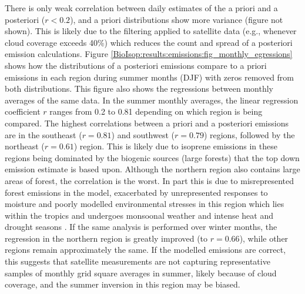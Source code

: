     
    
    
    
    
    There is only weak correlation between daily estimates of the a priori and a posteriori ($r < 0.2$), and a priori distributions show more variance (figure not shown).
    This is likely due to the filtering applied to satellite data (e.g., whenever cloud coverage exceeds 40\%) which reduces the count and spread of a posteriori emission calculations.
    Figure \ref{BioIsop:results:emissions:fig_monthly_egressions} shows how the distributions of a posteriori emissions compare to a priori emissions in each region during summer months (DJF) with zeros removed from both distributions. %
    This figure also shows the regressions between monthly averages of the same data. 
    In the summer monthly averages, the linear regression coefficient $r$ ranges from 0.2 to 0.81 depending on which region is being compared.
    The highest correlations between a priori and a posteriori emissions are in the southeast ($r=0.81$) and southwest ($r=0.79$) regions, followed by the northeast ($r=0.61$) region.
    This is likely due to isoprene emissions in these regions being dominated by the biogenic sources (large forests) that the top down emission estimate is based upon.
    Although the northern region also contains large areas of forest, the correlation is the worst.
    In part this is due to misrepresented forest emissions in the model, exacerbated by unrepresented responses to moisture and poorly modelled environmental stresses in this region which lies within the tropics and undergoes monsoonal weather and intense heat and drought seasons \parencite{Emmerson2016,Surl2018,Emmerson2019}.
    If the same analysis is performed over winter months, the regression in the northern region is greatly improved (to $r=0.66$), while other regions remain approximately the same.
    If the modelled emissions are correct, this suggests that satellite measurements are not capturing representative samples of monthly grid square averages in summer, likely because of cloud coverage, and the summer inversion in this region may be biased.
    
